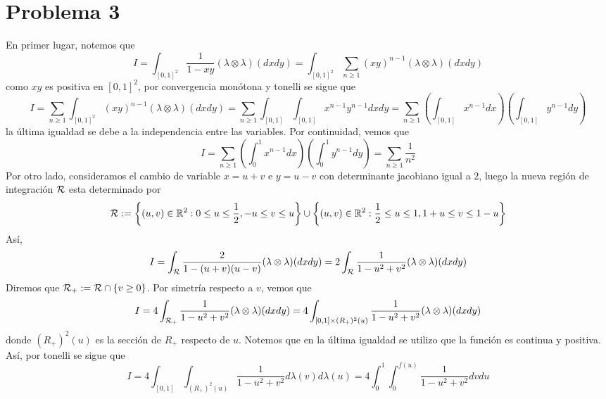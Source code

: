 \documentclass{article}
\begin{document}
\section*{Problema 3}
\noindent En primer lugar, notemos que
\begin{equation*}
    I=\int_{[0,1]^{2}}\frac{1}{1-xy}(\lambda\otimes\lambda)(dxdy)=\int_{[0,1]^{2}}
    \sum_{n\geq1}(xy)^{n-1}(\lambda\otimes\lambda)(dxdy)
\end{equation*}
como $xy$ es positiva en $[0,1]^{2}$, por convergencia monótona y tonelli se sigue que
\begin{equation*}
    I=\sum_{n\geq1}\int_{[0,1]^{2}}(xy)^{n-1}(\lambda\otimes\lambda)(dxdy)
    =\sum_{n\geq1}\int_{[0,1]}\int_{[0,1]}x^{n-1}y^{n-1}dxdy
    =\sum_{n\geq1}\left(\int_{[0,1]}x^{n-1}dx\right)\left(\int_{[0,1]}y^{n-1}dy\right)
\end{equation*}
la última igualdad se debe a la independencia entre las variables. Por continuidad, vemos que
\begin{equation*}
    I=\sum_{n\geq1}\left(\int_{0}^{1}x^{n-1}dx\right)\left(\int_{0}^{1}y^{n-1}dy\right)
    =\sum_{n\geq1}\frac{1}{n^{2}}
\end{equation*}
Por otro lado, consideramos el cambio de variable $x=u+v$ e $y=u-v$ con determinante jacobiano 
igual a $2$, luego la nueva región de integración $\mathcal{R}$ esta determinado por
\begin{equation*}
    \mathcal{R}:=\left\{(u,v)\in\mathbb{R}^{2}:0\leq u\leq\frac{1}{2},-u\leq v\leq u\right\}\cup
    \left\{(u,v)\in\mathbb{R}^{2}:\frac{1}{2}\leq u\leq1,1+u\leq v\leq 1-u\right\}
\end{equation*}
Así,
\begin{equation*}
    I=\int_{\mathcal{R}}\frac{2}{1-(u+v)(u-v)}(\lambda\otimes\lambda)(dxdy)
    =2\int_{\mathcal{R}}\frac{1}{1-u^{2}+v^{2}}(\lambda\otimes\lambda)(dxdy)
\end{equation*}
Diremos que $\mathcal{R}_{+}:=\mathcal{R}\cap\{v\geq0\}$. Por simetría respecto a $v$, vemos que
\begin{equation*}
    I=4\int_{\mathcal{R}_{+}}\frac{1}{1-u^{2}+v^{2}}(\lambda\otimes\lambda)(dxdy)
    =4\int_{[0,1]\times (R_{+})^{2}(u)}\frac{1}{1-u^{2}+v^{2}}(\lambda\otimes\lambda)(dxdy)
\end{equation*}
donde $(R_{+})^{2}(u)$ es la sección de $R_{+}$ respecto de $u$. Notemos que en la última igualdad 
se utilizo que la función es continua y positiva. Así, por tonelli se sigue que
\begin{equation*}
    I=4\int_{[0,1]}\int_{(R_{+})^{2}(u)}\frac{1}{1-u^{2}+v^{2}}d\lambda(v)d\lambda(u)
    =4\int_{0}^{1}\int_{0}^{f(u)}\frac{1}{1-u^{2}+v^{2}}dvdu
\end{equation*}
\end{document}
